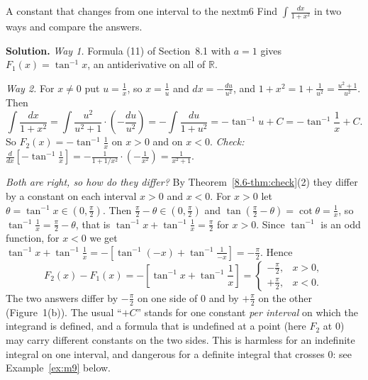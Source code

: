 \documentclass[11pt]{article}
\begin{document}
\begin{exmp}{A constant that changes from one interval to the next}{m6}
Find $\displaystyle\int\frac{dx}{1+x^2}$ in two ways and compare the answers.

\textbf{Solution.} \emph{Way 1.} Formula (11) of Section~8.1 with $a=1$ gives $F_1(x)=\tan^{-1}x$, an antiderivative on all of $\mathbb R$.

\emph{Way 2.} For $x\ne0$ put $u=\frac1x$, so $x=\frac1u$ and $dx=-\frac{du}{u^2}$, and $1+x^2=1+\frac1{u^2}=\frac{u^2+1}{u^2}$. Then
\[\int\frac{dx}{1+x^2}=\int\frac{u^2}{u^2+1}\cdot\left(-\frac{du}{u^2}\right)=-\int\frac{du}{1+u^2}=-\tan^{-1}u+C=-\tan^{-1}\frac1x+C .\]
So $F_2(x)=-\tan^{-1}\frac1x$ on $x>0$ and on $x<0$. \emph{Check:} $\frac d{dx}\left[-\tan^{-1}\frac1x\right]=-\frac1{1+1/x^2}\cdot\left(-\frac1{x^2}\right)=\frac1{x^2+1}$.

\emph{Both are right, so how do they differ?} By Theorem~\ref{8.6-thm:check}(2) they differ by a constant on each interval $x>0$ and $x<0$. For $x>0$ let $\theta=\tan^{-1}x\in\left(0,\frac\pi2\right)$. Then $\frac\pi2-\theta\in\left(0,\frac\pi2\right)$ and $\tan\left(\frac\pi2-\theta\right)=\cot\theta=\frac1x$, so $\tan^{-1}\frac1x=\frac\pi2-\theta$, that is $\tan^{-1}x+\tan^{-1}\frac1x=\frac\pi2$ for $x>0$. Since $\tan^{-1}$ is an odd function, for $x<0$ we get $\tan^{-1}x+\tan^{-1}\frac1x=-\left[\tan^{-1}(-x)+\tan^{-1}\frac1{-x}\right]=-\frac\pi2$. Hence
\[F_2(x)-F_1(x)=-\left[\tan^{-1}x+\tan^{-1}\frac1x\right]=\begin{cases}-\frac\pi2,&x>0,\\[2pt]+\frac\pi2,&x<0.\end{cases}\]
The two answers differ by $-\frac\pi2$ on one side of $0$ and by $+\frac\pi2$ on the other (Figure~1(b)). The usual ``$+C$'' stands for one constant \emph{per interval} on which the integrand is defined, and a formula that is undefined at a point (here $F_2$ at $0$) may carry different constants on the two sides. This is harmless for an indefinite integral on one interval, and dangerous for a definite integral that crosses $0$: see Example~\ref{ex:m9} below.
\end{exmp}
\end{document}
